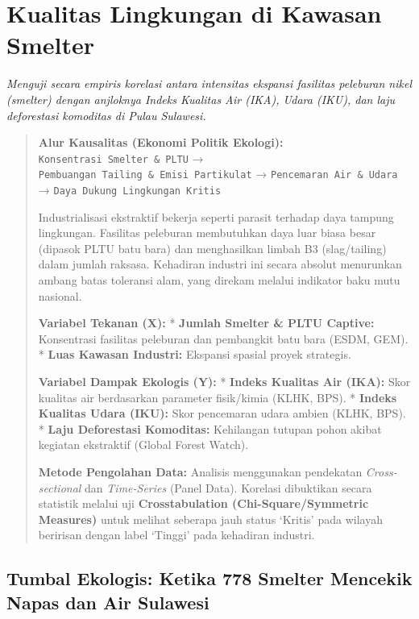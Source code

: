 \documentclass[
]{article}
\author{}
\date{}
\begin{document}
\section{Kualitas Lingkungan di Kawasan
Smelter}\label{kualitas-lingkungan-di-kawasan-smelter}

\emph{Menguji secara empiris korelasi antara intensitas ekspansi
fasilitas peleburan nikel (smelter) dengan anjloknya Indeks Kualitas Air
(IKA), Udara (IKU), dan laju deforestasi komoditas di Pulau Sulawesi.}

\begin{quote}
\textbf{Alur Kausalitas (Ekonomi Politik Ekologi):}
\texttt{Konsentrasi\ Smelter\ \&\ PLTU} →
\texttt{Pembuangan\ Tailing\ \&\ Emisi\ Partikulat} →
\texttt{Pencemaran\ Air\ \&\ Udara} →
\texttt{Daya\ Dukung\ Lingkungan\ Kritis}

Industrialisasi ekstraktif bekerja seperti parasit terhadap daya tampung
lingkungan. Fasilitas peleburan membutuhkan daya luar biasa besar
(dipasok PLTU batu bara) dan menghasilkan limbah B3 (slag/tailing) dalam
jumlah raksasa. Kehadiran industri ini secara absolut menurunkan ambang
batas toleransi alam, yang direkam melalui indikator baku mutu nasional.

\textbf{Variabel Tekanan (X):} * \textbf{Jumlah Smelter \& PLTU
Captive:} Konsentrasi fasilitas peleburan dan pembangkit batu bara
(ESDM, GEM). * \textbf{Luas Kawasan Industri:} Ekspansi spasial proyek
strategis.

\textbf{Variabel Dampak Ekologis (Y):} * \textbf{Indeks Kualitas Air
(IKA):} Skor kualitas air berdasarkan parameter fisik/kimia (KLHK, BPS).
* \textbf{Indeks Kualitas Udara (IKU):} Skor pencemaran udara ambien
(KLHK, BPS). * \textbf{Laju Deforestasi Komoditas:} Kehilangan tutupan
pohon akibat kegiatan ekstraktif (Global Forest Watch).

\textbf{Metode Pengolahan Data:} Analisis menggunakan pendekatan
\emph{Cross-sectional} dan \emph{Time-Series} (Panel Data). Korelasi
dibuktikan secara statistik melalui uji \textbf{Crosstabulation
(Chi-Square/Symmetric Measures)} untuk melihat seberapa jauh status
`Kritis' pada wilayah beririsan dengan label `Tinggi' pada kehadiran
industri.
\end{quote}

\subsection{Tumbal Ekologis: Ketika 778 Smelter Mencekik Napas dan Air
Sulawesi}\label{tumbal-ekologis-ketika-778-smelter-mencekik-napas-dan-air-sulawesi}
\end{document}

